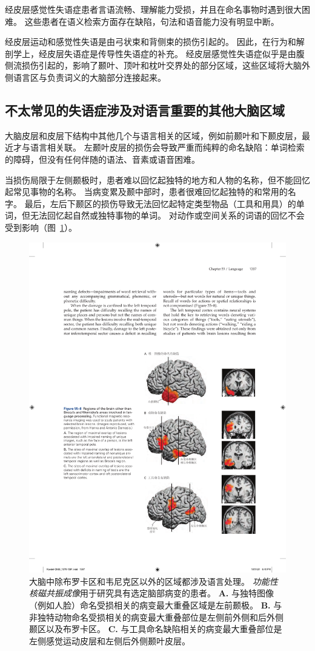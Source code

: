 经皮层感觉性失语症患者言语流畅、理解能力受损，并且在命名事物时遇到很大困难。
这些患者在语义检索方面存在缺陷，句法和语音能力没有明显中断。


经皮层运动和感觉性失语是由弓状束和背侧束的损伤引起的。
因此，在行为和解剖学上，经皮层失语症是传导性失语症的补充。
经皮层感觉性失语症似乎是由腹侧流损伤引起的，影响了颞叶、顶叶和枕叶交界处的部分区域，这些区域将大脑外侧语言区与负责词义的大脑部分连接起来。



\subsection{不太常见的失语症涉及对语言重要的其他大脑区域}

大脑皮层和皮层下结构中其他几个与语言相关的区域，例如前颞叶和下颞皮层，最近才与语言相关联。
左颞叶皮层的损伤会导致严重而纯粹的命名缺陷：单词检索的障碍，但没有任何伴随的语法、音素或语音困难。


当损伤局限于左侧颞极时，患者难以回忆起独特的地方和人物的名称，但不能回忆起常见事物的名称。
当病变累及颞中部时，患者很难回忆起独特的和常用的名字。
最后，左后下颞区的损伤导致无法回忆起特定类型物品（工具和用具）的单词，但无法回忆起自然或独特事物的单词。
对动作或空间关系的词语的回忆不会受到影响（图~\ref{fig:55_8}）。


\begin{figure}[htbp]
	\centering
	\includegraphics[width=0.79\linewidth]{chap55/fig_55_8}
	\caption{大脑中除布罗卡区和韦尼克区以外的区域都涉及语言处理。
		\textit{功能性核磁共振成像}用于研究具有选定脑部病变的患者。
		\textbf{A.} 与独特图像（例如人脸）命名受损相关的病变最大重叠区域是左前颞极。
		\textbf{B.} 与非独特动物命名受损相关的病变最大重叠部位是左侧前外侧和后外侧颞区以及布罗卡区。
		\textbf{C.} 与工具命名缺陷相关的病变最大重叠部位是左侧感觉运动皮层和左侧后外侧颞叶皮层。}
	\label{fig:55_8}
\end{figure}


